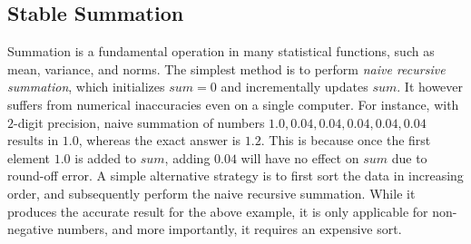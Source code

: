 

\subsection{Stable Summation}
\label{sec:sum}

Summation is a fundamental operation in many statistical functions, such as mean, variance, and norms. The simplest method is to perform {\em naive recursive summation}, which initializes $sum=0$ and incrementally updates $sum$. It however suffers from numerical inaccuracies even on a single computer. For instance, with $2$-digit precision, naive summation of numbers $1.0, 0.04, 0.04, 0.04, 0.04, 0.04$ results in $1.0$, whereas the exact answer is $1.2$. This is because once the first element $1.0$ is added to $sum$, adding $0.04$ will have no effect on $sum$ due to round-off error. %
A simple alternative strategy is to first sort the data in increasing order, and subsequently perform the naive recursive summation. While it produces the accurate result for the above example, it is only applicable for non-negative numbers, and more importantly, it requires an expensive sort. 


